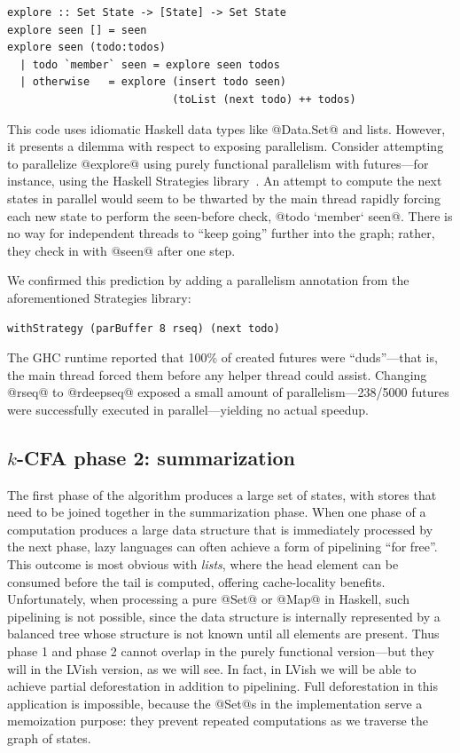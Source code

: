 \singlespacing
\begin{lstlisting}
explore :: Set State -> [State] -> Set State
explore seen [] = seen
explore seen (todo:todos)
  | todo `member` seen = explore seen todos
  | otherwise   = explore (insert todo seen)
                          (toList (next todo) ++ todos)  
\end{lstlisting}
\doublespacing

This code uses idiomatic Haskell data types like @Data.Set@ and lists.
However, it presents a dilemma with respect to exposing parallelism.
Consider attempting to parallelize @explore@ using purely functional
parallelism with futures---for instance, using the Haskell Strategies
library~\cite{marlow-par}.  An attempt to compute the next states in
parallel would seem to be thwarted by the main thread rapidly forcing
each new state to perform the seen-before check, @todo `member` seen@.
There is no way for independent threads to ``keep going'' further into
the graph; rather, they check in with @seen@ after one step.

We confirmed this prediction by adding a parallelism annotation from
the aforementioned Strategies library:

\singlespacing
\begin{lstlisting}
withStrategy (parBuffer 8 rseq) (next todo)
\end{lstlisting}
\doublespacing

The GHC runtime reported that 100\% of created futures were
``duds''---that is, the main thread forced them before any helper
thread could assist.  Changing @rseq@ to @rdeepseq@ exposed a small
amount of parallelism---238/5000 futures were successfully executed in
parallel---yielding no actual speedup.

\subsection{$k$-CFA phase 2: summarization}

The first phase of the algorithm produces a large set of states, with
stores that need to be joined together in the summarization phase.
When one phase of a computation produces a large data structure that
is immediately processed by the next phase, lazy languages can often
achieve a form of pipelining ``for free''.  This outcome is most
obvious with \emph{lists}, where the head element can be consumed
before the tail is computed, offering cache-locality benefits.
Unfortunately, when processing a pure @Set@ or @Map@ in Haskell, such
pipelining is not possible, since the data structure is internally
represented by a balanced tree whose structure is not known until all
elements are present.  Thus phase 1 and phase 2 cannot overlap in the
purely functional version---but they will in the LVish version, as we
will see.  In fact, in LVish we will be able to achieve partial
deforestation in addition to pipelining.  Full deforestation in this
application is impossible, because the @Set@s in the implementation
serve a memoization purpose: they prevent repeated computations as we
traverse the graph of states.

